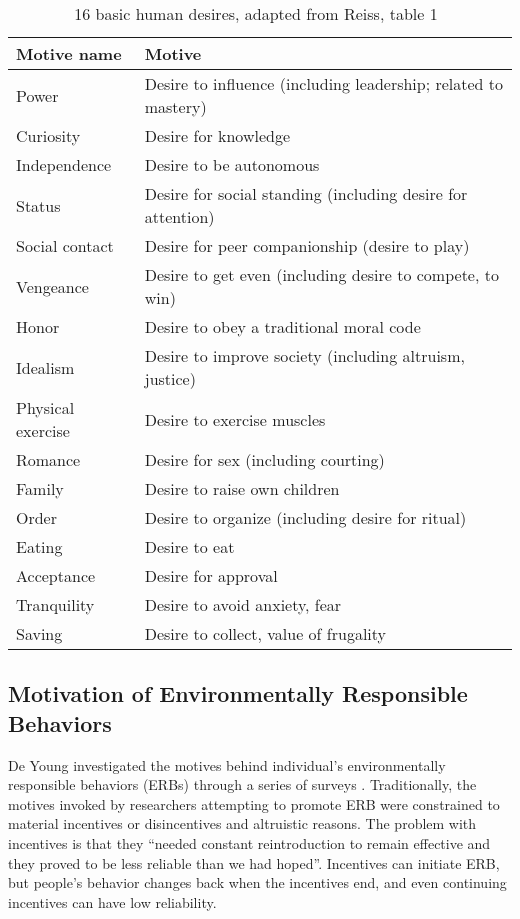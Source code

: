 \begin{table}[htbp]
	\centering
		\begin{tabular}{| l | l |}
			\hline
Motive name & Motive \\ \hline
Power & Desire to influence (including leadership; related to mastery) \\ \hline
Curiosity & Desire for knowledge \\ \hline
Independence & Desire to be autonomous \\ \hline
Status & Desire for social standing (including desire for attention) \\ \hline
Social contact & Desire for peer companionship (desire to play) \\ \hline
Vengeance & Desire to get even (including desire to compete, to win) \\ \hline
Honor & Desire to obey a traditional moral code \\ \hline
Idealism & Desire to improve society (including altruism, justice) \\ \hline
Physical exercise & Desire to exercise muscles \\ \hline
Romance & Desire for sex (including courting) \\ \hline
Family & Desire to raise own children \\ \hline
Order & Desire to organize (including desire for ritual) \\ \hline
Eating & Desire to eat \\ \hline
Acceptance & Desire for approval \\ \hline
Tranquility & Desire to avoid anxiety, fear \\ \hline
Saving & Desire to collect, value of frugality \\ \hline
		\end{tabular}
	\caption{16 basic human desires, adapted from Reiss, table 1~\cite{Reiss2004}}
\label{tab:16-basic-desires}
\end{table}


\subsection{Motivation of Environmentally Responsible Behaviors}

De Young investigated the motives behind individual's environmentally responsible behaviors (ERBs) through a series of surveys \cite{Young:2000fv}. Traditionally, the motives invoked by researchers attempting to promote ERB were constrained to material incentives or disincentives and altruistic reasons. The problem with incentives is that they ``needed constant reintroduction to remain effective and they proved to be less reliable than we had hoped''. Incentives can initiate ERB, but people's behavior changes back when the incentives end, and even continuing incentives can have low reliability.

